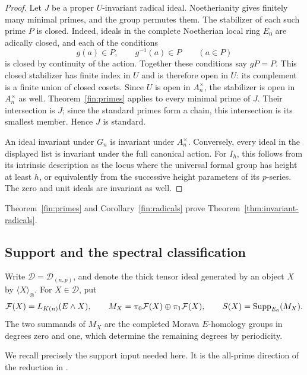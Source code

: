 \begin{proof}
Let \(J\) be a proper \(U\)-invariant radical ideal.
Noetherianity gives finitely many minimal primes, and the group
permutes them.  The stabilizer of each such prime \(P\) is closed.
Indeed, ideals in the complete Noetherian local ring \(E_0\) are
adically closed, and each of the conditions
\[
  g(a)\in P,\qquad g^{-1}(a)\in P \qquad(a\in P)
\]
is closed by continuity of the action.  Together these conditions
say \(gP=P\).  This closed stabilizer has finite index in \(U\) and is
therefore open in \(U\): its complement is a finite union of closed
cosets.  Since \(U\) is open in \(A_n^\times\), the stabilizer is
open in \(A_n^\times\) as well.
Theorem~\ref{fin:primes} applies to every minimal prime of \(J\).
Their intersection is \(J\); since the standard primes form a chain,
this intersection is its smallest member.  Hence \(J\) is standard.

An ideal invariant under \(G_n\) is invariant under
\(A_n^\times\).  Conversely, every ideal in the displayed list is
invariant under the full canonical action.  For \(I_h\), this follows
from its intrinsic description as the locus where the universal
formal group has height at least \(h\), or equivalently from the
successive height parameters of its \(p\)-series.  The zero and unit
ideals are invariant as well.
\end{proof}

Theorem~\ref{fin:primes} and Corollary~\ref{fin:radicals} prove
Theorem~\ref{thm:invariant-radicals}.

\subsection{Support and the spectral classification}
\label{fin:classification}

Write \(\mathcal D=\mathcal D_{(n,p)}\), and denote the thick tensor
ideal generated by an object \(X\) by \(\langle X\rangle_\otimes\).
For \(X\in\mathcal D\), put
\[
  \mathcal F(X)=L_{K(n)}(E\wedge X),\qquad
  M_X=\pi_0\mathcal F(X)\oplus\pi_1\mathcal F(X),\qquad
  S(X)=\operatorname{Supp}_{E_0}(M_X).
\]
The two summands of \(M_X\) are the completed Morava \(E\)-homology
groups in degrees zero and one, which determine the remaining degrees
by periodicity.

We recall precisely the support input needed here.
It is the all-prime direction of the reduction in
\cite[Theorem~4.9]{BHN22}.

